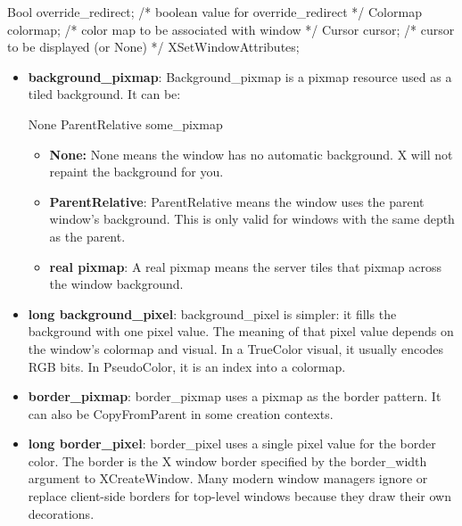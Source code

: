 \documentclass{report}
\begin{document}
\begin{itemize}
\begin{cppcode}
{                    Bool override_redirect;         /* boolean value for override_redirect */
                    Colormap colormap;              /* color map to be associated with window */
                    Cursor cursor;                  /* cursor to be displayed (or None) */
                } XSetWindowAttributes;
            \end{cppcode}
            \begin{itemize}
                \item \textbf{background\_pixmap}: Background\_pixmap is a pixmap resource used as a tiled background. It can be:
                    \bigbreak \noindent 
                    \begin{cppcode}
                        None
                        ParentRelative
                        some_pixmap
                    \end{cppcode}
                    \begin{itemize}
                        \item \textbf{None:} None means the window has no automatic background. X will not repaint the background for you.
                        \item \textbf{ParentRelative}: ParentRelative means the window uses the parent window’s background. This is only valid for windows with the same depth as the parent.
                        \item \textbf{real pixmap}: A real pixmap means the server tiles that pixmap across the window background.
                    \end{itemize}
                \item \textbf{long background\_pixel}: background\_pixel is simpler: it fills the background with one pixel value. The meaning of that pixel value depends on the window’s colormap and visual. In a TrueColor visual, it usually encodes RGB bits. In PseudoColor, it is an index into a colormap.
                \item \textbf{border\_pixmap}: border\_pixmap uses a pixmap as the border pattern. It can also be CopyFromParent in some creation contexts.
                \item \textbf{long border\_pixel}: border\_pixel uses a single pixel value for the border color.
                    \bigbreak \noindent 
                    The border is the X window border specified by the border\_width argument to XCreateWindow. Many modern window managers ignore or replace client-side borders for top-level windows because they draw their own decorations.

\end{itemize}
\end{itemize}
\end{document}
